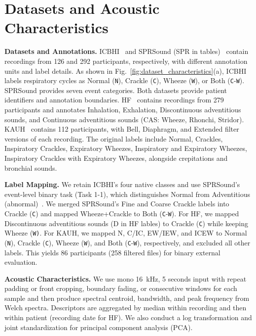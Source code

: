 \section{Datasets and Acoustic Characteristics}
\label{sec:data_alignment}\label{sec:acoustic_characteristics}
\noindent\textbf{Datasets and Annotations. }
ICBHI~\cite{rocha2019icbhi} and SPRSound (SPR in tables)~\cite{zhang2022sprsound} contain recordings from 126 and 292 participants, respectively, with different annotation units and label details. As shown in Fig.~\ref{fig:dataset_characteristics}(a), ICBHI labels respiratory cycles as Normal (\texttt{N}), Crackle (\texttt{C}), Wheeze (\texttt{W}), or Both (\texttt{C}-\texttt{W}). SPRSound provides seven event categories. Both datasets provide patient identifiers and annotation boundaries. HF~\cite{hsu2021hflung} contains recordings from 279 participants and annotates Inhalation, Exhalation, Discontinuous adventitious sounds, and Continuous adventitious sounds (CAS: Wheeze, Rhonchi, Stridor). KAUH~\cite{fraiwan2021kauh} contains 112 participants, with Bell, Diaphragm, and Extended filter versions of each recording. The original labels include Normal, Crackles, Inspiratory Crackles, Expiratory Wheezes, Inspiratory and Expiratory Wheezes, Inspiratory Crackles with Expiratory Wheezes, alongside crepitations and bronchial sounds.

\noindent\textbf{Label Mapping. }
We retain ICBHI's four native classes and use SPRSound's event-level binary task (Task 1-1), which distinguishes Normal from Adventitious (abnormal)~\cite{zhang2022sprsound}. We merged SPRSound's Fine and Coarse Crackle labels into Crackle (\texttt{C}) and mapped Wheeze+Crackle to Both (\texttt{C}-\texttt{W}). For HF, we mapped Discontinuous adventitious sounds (D in HF lables) to Crackle (\texttt{C}) while keeping Wheeze (\texttt{W)}. For KAUH, we mapped N, C/IC, EW/IEW, and ICEW to Normal (\texttt{N}), Crackle (\texttt{C}), Wheeze (\texttt{W}), and Both (\texttt{C}-\texttt{W}), respectively, and excluded all other labels. This yields 86 participants (258 filtered files) for binary external evaluation. 

\noindent\textbf{Acoustic Characteristics. }
We use mono 16~kHz, 5 seconds input with repeat padding or front cropping, boundary fading, or consecutive windows for each sample and then produce spectral centroid, bandwidth, and peak frequency from Welch spectra. Descriptors are aggregated by median within recording and then within patient (recording date for HF). We also conduct a log transformation and joint standardization for principal component analysis (PCA). 

